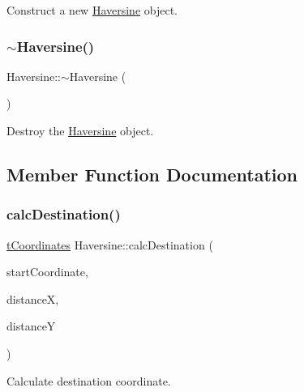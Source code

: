 Construct a new \hyperlink{class_haversine}{Haversine} object. 

\mbox{\label{class_haversine_a76d03fdeba1099dedca1f0c53d20c335}} 
\subsubsection{\texorpdfstring{$\sim$\+Haversine()}{~Haversine()}}
{\footnotesize\ttfamily Haversine\+::$\sim$\+Haversine (\begin{DoxyParamCaption}{ }\end{DoxyParamCaption})}



Destroy the \hyperlink{class_haversine}{Haversine} object. 



\subsection{Member Function Documentation}
\mbox{\label{class_haversine_a987c479bce2991c1eb55953a787ff144}} 
\subsubsection{\texorpdfstring{calc\+Destination()}{calcDestination()}}
{\footnotesize\ttfamily \hyperlink{_psd_message_decoder_8h_a559ada7297c8c6c2337f9e233e73aeca}{t\+Coordinates} Haversine\+::calc\+Destination (\begin{DoxyParamCaption}\item[{\hyperlink{_psd_message_decoder_8h_a559ada7297c8c6c2337f9e233e73aeca}{t\+Coordinates}}]{start\+Coordinate,  }\item[{double}]{distanceX,  }\item[{double}]{distanceY }\end{DoxyParamCaption})\hspace{0.3cm}{\ttfamily [static]}}



Calculate destination coordinate. 


